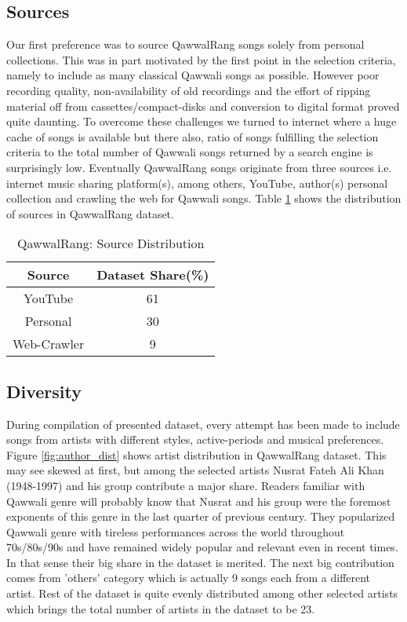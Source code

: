 \documentclass{article}
\begin{document}
\subsection{Sources}
Our first preference was to source QawwalRang songs solely from personal collections. This was in part motivated by the first point in the selection criteria, namely to include as many classical Qawwali songs as possible. However poor recording quality, non-availability of old recordings and the effort of ripping material off from cassettes/compact-disks and conversion to digital format proved quite daunting. To overcome these challenges we turned to internet where a huge cache of songs is available but there also, ratio of songs fulfilling the selection criteria to the total number of Qawwali songs returned by a search engine is surprisingly low. Eventually QawwalRang songs originate from three sources i.e. internet music sharing platform(s), among others, YouTube, author(s) personal collection and crawling the web for Qawwali songs. Table \ref{tab:sources} shows the distribution of sources in QawwalRang dataset.
\begin{table}[htpb]
\centering
  \begin{tabular}{|c | c|}
  \toprule
  \bfseries Source & \bfseries Dataset Share(\%) \\
  \hline \hline
  YouTube  & 61 \\
  \hline
  Personal & 30 \\
  \hline
  Web-Crawler & 9  \\
  \bottomrule
  \end{tabular}
  \caption{QawwalRang: Source Distribution}
\label{tab:sources}
\end{table}

\subsection{Diversity}

During compilation of presented dataset, every attempt has been made to include songs from artists with different styles, active-periods and musical preferences. Figure \ref{fig:author_dist} shows artist distribution in QawwalRang dataset. This may see skewed at first, but among the selected artists Nusrat Fateh Ali Khan (1948-1997) \citep{nusrat} and his group contribute a major share. Readers familiar with Qawwali genre will probably know that Nusrat and his group were the foremost exponents of this genre in the last quarter of previous century. They popularized Qawwali genre with tireless performances across the world throughout 70s/80s/90s and have remained widely popular and relevant even in recent times. In that sense their big share in the dataset is merited. The next big contribution comes from 'others' category which is actually 9 songs each from a different artist. Rest of the dataset is quite evenly distributed among other selected artists which brings the total number of artists in the dataset to be 23.
\end{document}
